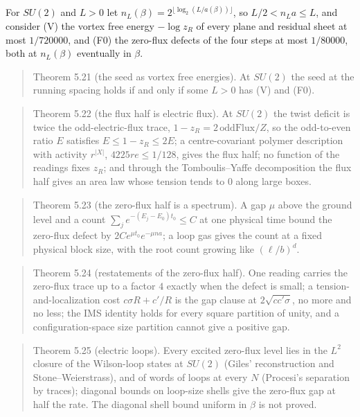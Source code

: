 \documentclass[10pt,letterpaper,twocolumn]{article}
\begin{document}
For \(SU(2)\) and \(L>0\) let \(n_L(\beta)=2^{\lfloor\log_2(L/a(\beta))\rfloor}\), so \(L/2<n_La\le L\), and consider (V) the vortex free energy \(-\log z_R\) of every plane and residual sheet at most \(1/720000\), and (F0) the zero-flux defects of the four steps at most \(1/80000\), both at \(n_L(\beta)\) eventually in \(\beta\).

\begin{quote}
Theorem 5.21 (the seed as vortex free energies). At \(SU(2)\) the seed at the running spacing holds if and only if some \(L>0\) has (V) and (F0).
\end{quote}

\begin{quote}
Theorem 5.22 (the flux half is electric flux). At \(SU(2)\) the twist deficit is twice the odd-electric-flux trace, \(1-z_R=2\,\mathrm{oddFlux}/Z\), so the odd-to-even ratio \(E\) satisfies \(E\le1-z_R\le2E\); a centre-covariant polymer description with activity \(r^{|X|}\), \(4225re\le1/128\), gives the flux half; no function of the readings fixes \(z_R\); and through the Tomboulis--Yaffe decomposition the flux half gives an area law whose tension tends to \(0\) along large boxes.
\end{quote}

\begin{quote}
Theorem 5.23 (the zero-flux half is a spectrum). A gap \(\mu\) above the ground level and a count \(\sum_je^{-(E_j-E_0)t_0}\le C\) at one physical time bound the zero-flux defect by \(2Ce^{\mu t_0}e^{-\mu na}\); a loop gas gives the count at a fixed physical block size, with the root count growing like \((\ell/b)^d\).
\end{quote}

\begin{quote}
Theorem 5.24 (restatements of the zero-flux half). One reading carries the zero-flux trace up to a factor \(4\) exactly when the defect is small; a tension-and-localization cost \(c\sigma R+c'/R\) is the gap clause at \(2\sqrt{cc'\sigma}\), no more and no less; the IMS identity holds for every square partition of unity, and a configuration-space size partition cannot give a positive gap.
\end{quote}

\begin{quote}
Theorem 5.25 (electric loops). Every excited zero-flux level lies in the \(L^2\) closure of the Wilson-loop states at \(SU(2)\) (Giles' reconstruction and Stone--Weierstrass), and of words of loops at every \(N\) (Procesi's separation by traces); diagonal bounds on loop-size shells give the zero-flux gap at half the rate. The diagonal shell bound uniform in \(\beta\) is not proved.
\end{quote}
\end{document}
